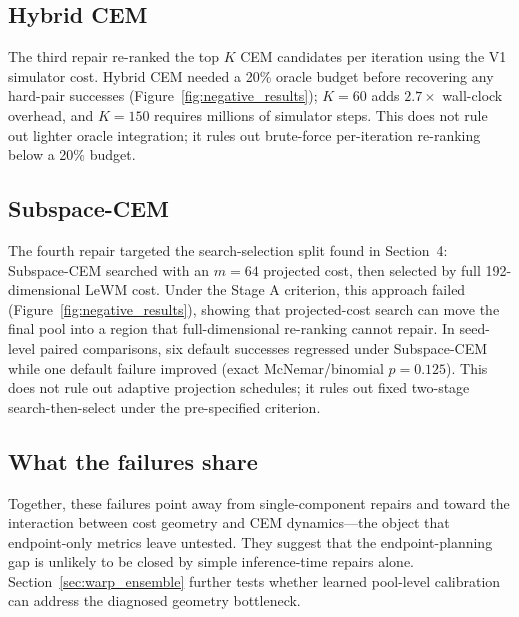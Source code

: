 \subsection{Hybrid CEM}

The third repair re-ranked the top $K$ CEM candidates per iteration using the V1 simulator cost. Hybrid CEM needed a 20\% oracle budget before recovering any hard-pair successes (Figure~\ref{fig:negative_results}); $K=60$ adds $2.7\times$ wall-clock overhead, and $K=150$ requires millions of simulator steps. This does not rule out lighter oracle integration; it rules out brute-force per-iteration re-ranking below a 20\% budget.

\subsection{Subspace-CEM}

The fourth repair targeted the search-selection split found in Section~4: Subspace-CEM searched with an $m=64$ projected cost, then selected by full 192-dimensional LeWM cost. Under the Stage A criterion, this approach failed (Figure~\ref{fig:negative_results}), showing that projected-cost search can move the final pool into a region that full-dimensional re-ranking cannot repair. In seed-level paired comparisons, six default successes regressed under Subspace-CEM while one default failure improved (exact McNemar/binomial $p=0.125$). This does not rule out adaptive projection schedules; it rules out fixed two-stage search-then-select under the pre-specified criterion.

\subsection{What the failures share}

Together, these failures point away from single-component repairs and toward the interaction between cost geometry and CEM dynamics---the object that endpoint-only metrics leave untested. They suggest that the endpoint-planning gap is unlikely to be closed by simple inference-time repairs alone. Section~\ref{sec:warp_ensemble} further tests whether learned pool-level calibration can address the diagnosed geometry bottleneck.
